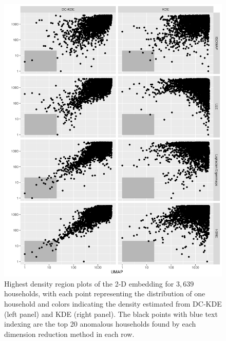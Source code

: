 \documentclass[11pt,a4paper,]{article}
\begin{document}
\begin{figure}

{\centering \includegraphics[width=0.9\linewidth]{figures/Electricity_2d_rankplot_3639id_umapvs4ml_radius20_r180} 

}

\caption{Highest density region plots of the 2-D embedding for $3,639$ households, with each point representing the distribution of one household and colors indicating the density estimated from DC-KDE (left panel) and KDE (right panel). The black points with blue text indexing are the top 20 anomalous households found by each dimension reduction method in each row.}\label{fig:electricityrank}
\end{figure}
\end{document}
